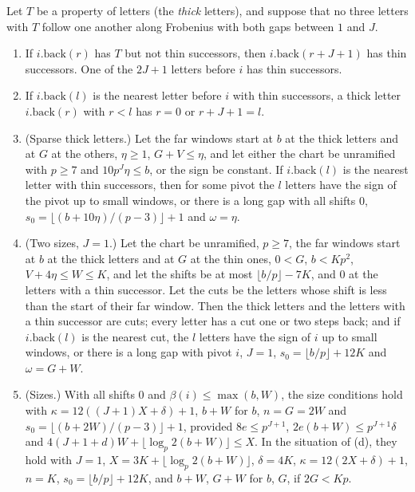 \begin{lemma}\label{lem:cut-patterns}
Let $T$ be a property of letters (the \emph{thick} letters), and suppose that no three letters with $T$ follow one another along Frobenius with both gaps between $1$ and $J$.
\begin{enumerate}[label=\textup{(\alph*)}]
\item If $i.\mathrm{back}(r)$ has $T$ but not thin successors, then $i.\mathrm{back}(r+J+1)$ has thin successors. One of the $2J+1$ letters before $i$ has thin successors.
\item If $i.\mathrm{back}(l)$ is the nearest letter before $i$ with thin successors, a thick letter $i.\mathrm{back}(r)$ with $r<l$ has $r=0$ or $r+J+1=l$.
\item (Sparse thick letters.) Let the far windows start at $b$ at the thick letters and at $G$ at the others, $\eta\ge1$, $G+V\le\eta$, and let either the chart be unramified with $p\ge7$ and $10p^J\eta\le b$, or the sign be constant. If $i.\mathrm{back}(l)$ is the nearest letter with thin successors, then for some pivot the
$l$ letters have the sign of the pivot up to small windows, or there is a long gap with all shifts $0$, $s_0=\lfloor(b+10\eta)/(p-3)\rfloor+1$ and $\omega=\eta$.
\item (Two sizes, $J=1$.) Let the chart be unramified, $p\ge7$, the far windows start at $b$ at the thick letters and at $G$ at the thin ones, $0<G$, $b<Kp^2$, $V+4\eta\le W\le K$, and let the shifts be at most $\lfloor b/p\rfloor-7K$, and $0$ at the letters with a thin successor. Let the cuts be the letters whose shift is less than the start of
their far window. Then the thick letters and the letters with a thin successor are cuts; every letter has a cut one or two steps back; and if $i.\mathrm{back}(l)$ is the nearest cut, the $l$ letters have the sign of $i$ up to small windows, or there is a long gap with pivot $i$, $J=1$, $s_0=\lfloor b/p\rfloor+12K$ and
$\omega=G+W$.
\item (Sizes.) With all shifts $0$ and $\beta(i)\le\max(b,W)$, the size conditions hold with $\kappa=12((J+1)X+\delta)+1$, $b+W$ for $b$, $n=G=2W$ and $s_0=\lfloor(b+2W)/(p-3)\rfloor+1$, provided $8e\le p^{J+1}$, $2e(b+W)\le p^{J+1}\delta$ and $4(J+1+d)W+\lfloor\log_p2(b+W)\rfloor\le X$. In the
situation of (d), they hold with $J=1$, $X=3K+\lfloor\log_p2(b+W)\rfloor$, $\delta=4K$, $\kappa=12(2X+\delta)+1$, $n=K$, $s_0=\lfloor b/p\rfloor+12K$, and $b+W$, $G+W$ for $b$, $G$, if $2G<Kp$.
\end{enumerate}
\end{lemma}

